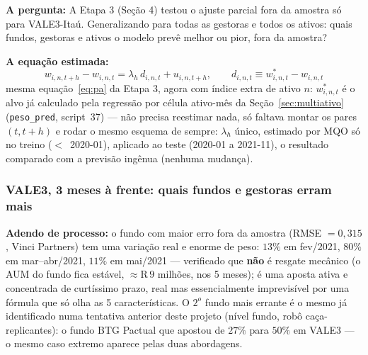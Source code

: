 \documentclass[11pt,a4paper]{article}
\newcommand{\pergunta}[1]{\par\vspace{4pt}\noindent\textbf{\color{azul}A pergunta:} #1\par\vspace{2pt}}
\newcommand{\equacao}[0]{\par\vspace{4pt}\noindent\textbf{\color{vermelho}A equação estimada:}\ }
\begin{document}
\pergunta{A Etapa 3 (Seção 4) testou o ajuste parcial fora da amostra só para VALE3-Itaú.
Generalizando para todas as gestoras e todos os ativos: quais fundos, gestoras e ativos o modelo
prevê melhor ou pior, fora da amostra?}

\equacao
$$w_{i,n,t+h} - w_{i,n,t} = \lambda_h\, d_{i,n,t} + u_{i,n,t+h}, \qquad
d_{i,n,t} \equiv w^*_{i,n,t} - w_{i,n,t}$$
mesma equação~\eqref{eq:pa} da Etapa 3, agora com índice extra de ativo $n$: $w^*_{i,n,t}$ é o
alvo já calculado pela regressão por célula ativo-mês da Seção~\ref{sec:multiativo}
(\texttt{peso\_pred}, script~37) --- não precisa reestimar nada, só faltava montar os pares
$(t,t+h)$ e rodar o mesmo esquema de sempre: $\lambda_h$ único, estimado por MQO só no treino
($<$~2020-01), aplicado ao teste (2020-01 a 2021-11), o resultado comparado com a previsão
ingênua (nenhuma mudança).

\subsubsection*{VALE3, 3 meses à frente: quais fundos e gestoras erram mais}

\textbf{Adendo de processo:} o fundo com maior erro fora da amostra (RMSE $=0{,}315$, Vinci
Partners) tem uma variação real e enorme de peso: $13\%$ em fev/2021, $80\%$ em mar--abr/2021,
$11\%$ em mai/2021 --- verificado que \textbf{não} é resgate mecânico (o AUM do fundo fica estável,
${\approx}$R$\,9$ milhões, nos 5 meses); é uma aposta ativa e concentrada de curtíssimo prazo, real
mas essencialmente imprevisível por uma fórmula que só olha as 5 características. O $2^o$ fundo
mais errante é o mesmo já identificado numa tentativa anterior deste projeto (nível fundo, robô
caça-replicantes): o fundo BTG Pactual que apostou de $27\%$ para $50\%$ em VALE3 --- o mesmo caso
extremo aparece pelas duas abordagens.
\end{document}
